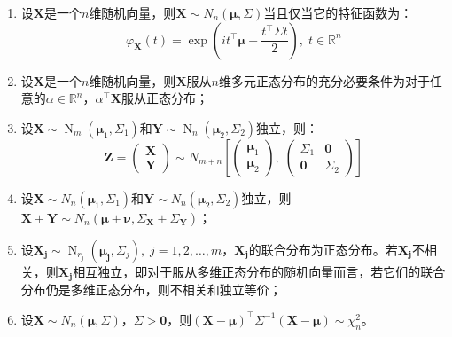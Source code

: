 \begin{property}
\begin{enumerate}
\begin{equation*}
\begin{pmatrix}
				\vdots & \vdots & \ddots & \vdots \\
				\sigma_{i_ki_1} & \sigma_{i_ki_2} & \cdots & \sigma_{i_ki_k}
			\end{pmatrix}
		\end{equation*}
		\item 设$\mathbf{X}$是一个$n$维随机向量，则$\mathbf{X}\sim N_n(\boldsymbol{\mu},\Sigma)$当且仅当它的特征函数为：
		\begin{equation*}
			\varphi_\mathbf{X}(t)=\exp\left(it^{\top}\boldsymbol{\mu}-\frac{t^{\top}\Sigma t}{2}\right),\;t\in\mathbb{R}^{n}
		\end{equation*}
		\item 设$\mathbf{X}$是一个$n$维随机向量，则$\mathbf{X}$服从$n$维多元正态分布的充分必要条件为对于任意的$\alpha\in\mathbb{R}^{n}$，$\alpha^{\top}\mathbf{X}$服从正态分布；
		\item 设$\mathbf{X}\sim\operatorname{N}_m(\boldsymbol{\mu}_1,\Sigma_1)$和$\mathbf{Y}\sim\operatorname{N}_n(\boldsymbol{\mu}_2,\Sigma_2)$独立，则：
		\begin{equation*}
			\mathbf{Z}=
			\begin{pmatrix}
				\mathbf{X} \\
				\mathbf{Y}
			\end{pmatrix}
			\sim N_{m+n}\left[
			\begin{pmatrix}
				\boldsymbol{\mu}_{1} \\
				\boldsymbol{\mu}_{2}
			\end{pmatrix},\;
			\begin{pmatrix}
				\Sigma_1 & \mathbf{0} \\
				\mathbf{0} & \Sigma_2
			\end{pmatrix}
			\right]
		\end{equation*}
		\item 设$\mathbf{X}\sim N_n(\boldsymbol{\mu}_1,\Sigma_1)$和$\mathbf{Y}\sim N_n(\boldsymbol{\mu}_2,\Sigma_2)$独立，则$\mathbf{X}+\mathbf{Y}\sim N_n(\boldsymbol{\mu}+\boldsymbol{\nu},\Sigma_\mathbf{X}+\Sigma_\mathbf{Y})$；
		\item 设$\mathbf{X_j}\sim\operatorname{N}_{r_j}(\boldsymbol{\mu_j},\Sigma_{j}),\;j=1,2,\dots,m$，$\mathbf{X_j}$的联合分布为正态分布。若$\mathbf{X_j}$不相关，则$\mathbf{X_j}$相互独立，即对于服从多维正态分布的随机向量而言，若它们的联合分布仍是多维正态分布，则不相关和独立等价；
		\item 设$\mathbf{X}\sim N_n(\boldsymbol{\mu},\Sigma)$，$\Sigma>\mathbf{0}$，则$(\mathbf{X}-\boldsymbol{\mu})^{\top}\Sigma^{-1}(\mathbf{X}-\boldsymbol{\mu})\sim\chi_n^2$。
	\end{enumerate}
\end{property}
